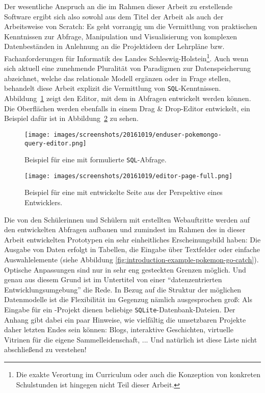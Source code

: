 Der wesentliche Anspruch an die im Rahmen dieser Arbeit zu erstellende Software ergibt sich also sowohl aus dem Titel der Arbeit als auch der Arbeitsweise von Scratch: Es geht vorrangig um die Vermittlung von praktischen Kenntnissen zur Abfrage, Manipulation und Visualisierung von komplexen Datenbeständen in Anlehnung an die Projektideen der Lehrpläne \cite{lehrplan-inf-sek-1} bzw. Fachanforderungen \cite{lehrplan-inf-sek-2} für Informatik des Landes Schleswig-Holstein\footnote{Die exakte Verortung im Curriculum oder auch die Konzeption von konkreten Schulstunden ist hingegen nicht Teil dieser Arbeit.}. Auch wenn sich aktuell eine zunehmende Pluralität von Paradigmen zur Datenspeicherung abzeichnet, welche das relationale Modell ergänzen oder in Frage stellen, behandelt diese Arbeit explizit die Vermittlung von \texttt{SQL}-Kenntnissen. Abbildung~\ref{fig:introduction-example-pokemon-go-query-editor} zeigt den Editor, mit dem in \idename{} Abfragen entwickelt werden können. Die Oberflächen werden ebenfalls in einem Drag \& Drop-Editor entwickelt, ein Beispiel dafür ist in Abbildung~\ref{fig:introduction-example-pokemon-go-page-editor} zu sehen.

\begin{figure}[h]
  \texttt{[image: images/screenshots/20161019/enduser-pokemongo-query-editor.png]}
  \caption{Beispiel für eine mit \idename{} formulierte \texttt{SQL}-Abfrage.}
  \label{fig:introduction-example-pokemon-go-query-editor}
\end{figure}

\begin{figure}[p]
  \texttt{[image: images/screenshots/20161019/editor-page-full.png]}
  \caption{Beispiel für eine mit \idename{} entwickelte Seite aus der Perspektive eines Entwicklers.}
  \label{fig:introduction-example-pokemon-go-page-editor}
\end{figure}

Die von den Schülerinnen und Schülern mit \idename{} erstellten Webauftritte werden auf den entwickelten Abfragen aufbauen und zumindest im Rahmen des in dieser Arbeit entwickelten Prototypen ein sehr einheitliches Erscheinungsbild haben: Die Ausgabe von Daten erfolgt in Tabellen, die Eingabe über Textfelder oder einfache Auswahlelemente (siehe Abbildung \ref{fig:introduction-example-pokemon-go-catch}). Optische Anpassungen sind nur in sehr eng gesteckten Grenzen möglich. Und genau aus diesem Grund ist im Untertitel von einer "`datenzentrierten Entwicklungsumgebung"' die Rede. In Bezug auf die Struktur der möglichen Datenmodelle ist die Flexibilität im Gegenzug nämlich ausgesprochen groß: Als Eingabe für ein \idename{}-Projekt dienen beliebige \texttt{SQLite}-Datenbank-Dateien. Der Anhang gibt dabei ein paar Hinweise, wie vielfältig die umsetzbaren Projekte daher letzten Endes sein können: Blogs, interaktive Geschichten, virtuelle Vitrinen für die eigene Sammelleidenschaft, ... Und natürlich ist diese Liste nicht abschließend zu verstehen!

